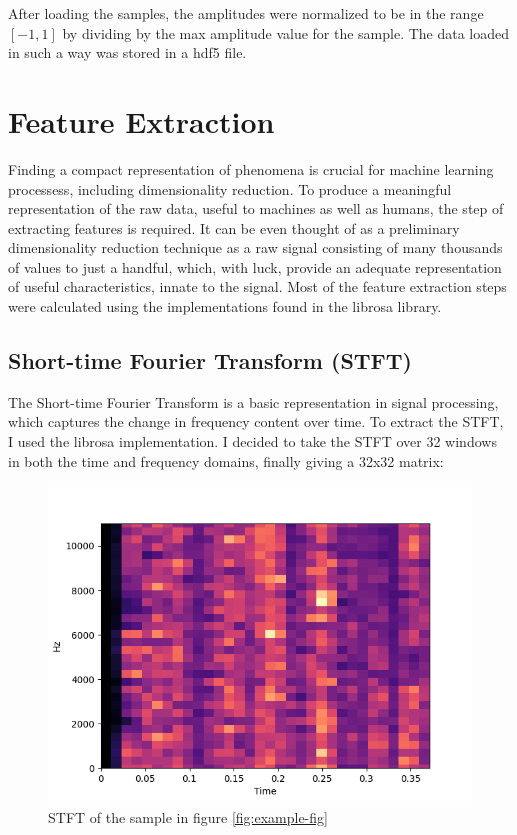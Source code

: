 \documentclass[a4paper, 12pt, twoside]{report}
\begin{document}
After loading the samples, the amplitudes were normalized to be in the range \([-1, 1]\) by dividing by the max amplitude value for the sample. The data loaded in such a way was stored in a hdf5 file.

\section{Feature Extraction}
\label{sec:org8d85bd5}

Finding a compact representation of phenomena is crucial for machine learning processess, including dimensionality reduction. To produce a meaningful representation of the raw data, useful to machines as well as humans, the step of extracting features is required. It can be even thought of as a preliminary dimensionality reduction technique as a raw signal consisting of many thousands of values to just a handful, which, with luck, provide an adequate representation of useful characteristics, innate to the signal. Most of the feature extraction steps were calculated using the implementations found in the librosa library.


\subsection{Short-time Fourier Transform (STFT)}
\label{sec:org0c9e9c5}

The Short-time Fourier Transform is a basic representation in signal processing, which captures the change in frequency content over time.
To extract the STFT, I used the librosa implementation. I decided to take the STFT over 32 windows in both the time and frequency domains, finally giving a 32x32 matrix:

\begin{figure}[H]
\centering
\includegraphics[width=.7\linewidth]{./Figures/stft.png}
\caption{STFT of the sample in figure \ref{fig:example-fig}}
\end{figure}
\end{document}
